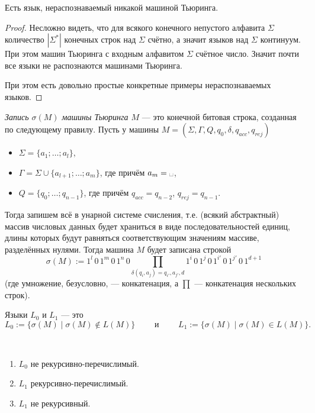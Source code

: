 \documentclass[12pt,a4paper]{article}
\newcommand{\spacesymbol}{\ensuremath{\text{\textvisiblespace}}}
\begin{document}
    \begin{theorem}
        Есть язык, нераспознаваемый никакой машиной Тьюринга.
    \end{theorem}

    \begin{proof}
        Несложно видеть, что для всякого конечного непустого алфавита $\Sigma$ количество $|\Sigma^*|$ конечных строк над $\Sigma$ счётно, а значит языков над $\Sigma$ континуум. При этом машин Тьюринга с входным алфавитом $\Sigma$ счётное число. Значит почти все языки не распознаются машинами Тьюринга.

        При этом есть довольно простые конкретные примеры нераспознаваемых языков.
    \end{proof}

    \begin{definition}
        \emph{Запись $\sigma(M)$ машины Тьюринга $M$} --- это конечной битовая строка, созданная по следующему правилу. Пусть у машины $M = (\Sigma, \Gamma, Q, q_0, \delta, q_{acc}, q_{rej})$
        \begin{itemize}
            \item $\Sigma = \{a_1; \dots; a_l\}$,
            \item $\Gamma = \Sigma \cup \{a_{l+1}; \dots; a_m\}$, где причём $a_m = \spacesymbol$,
            \item $Q = \{q_0; \dots; q_{n-1}\}$, где причём $q_{acc} = q_{n-2}$, $q_{rej} = q_{n-1}$.
        \end{itemize}
        Тогда запишем всё в унарной системе счисления, т.е. (всякий абстрактный) массив числовых данных будет храниться в виде последовательностей единиц, длины которых будут равняться соответствующим значениям массиве, разделённых нулями. Тогда машина $M$ будет записана строкой
        \[\sigma(M) := 1^l\, 0\, 1^m\, 0\, 1^n\, 0 \prod_{\delta(q_i, a_j) = q_{i'}, a_{j'}, d} 1^i\, 0\, 1^j\, 0\, 1^{i'}\, 0\, 1^{j'}\, 0\, 1^{d+1}\]
        (где умножение, безусловно, --- конкатенация, а $\prod$ --- конкатенация нескольких строк).
    \end{definition}

    \begin{definition}
        Языки $L_0$ и $L_1$ --- это
        \[
            L_0 := \{\sigma(M) \mid \sigma(M) \notin L(M)\}
            \qquad \text{ и } \qquad
            L_1 := \{\sigma(M) \mid \sigma(M) \in L(M)\}.
        \]
    \end{definition}

    \begin{theorem}\ 
        \begin{enumerate}
            \item $L_0$ не рекурсивно-перечислимый.
            \item $L_1$ рекурсивно-перечислимый.
            \item $L_1$ не рекурсивный.
        \end{enumerate}
    \end{theorem}
\end{document}
